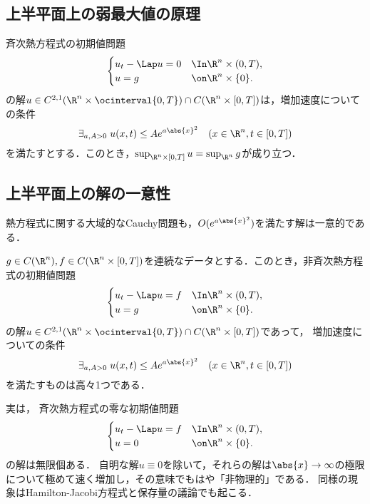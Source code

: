 \documentclass[uplatex,dvipdfmx]{jsreport}
\begin{document}
\subsection{上半平面上の弱最大値の原理}

\begin{theorem}[非有界領域上の最大値の原理]
    斉次熱方程式の初期値問題
    \[\begin{cases}
        u_t-\Lap u=0&\In\R^n\times(0,T),\\
        u=g&\on\R^n\times\{0\}.
    \end{cases}\]
    の解$u\in C^{2,1}(\R^n\times\ocinterval{0,T})\cap C(\R^n\times[0,T])$は，増加速度についての条件
    \[\exists_{a,A>0}\;u(x,t)\le Ae^{a\abs{x}^2}\quad(x\in\R^n,t\in[0,T])\]
    を満たすとする．このとき，$\sup_{\R^n\times[0,T]}u=\sup_{\R^n}g$が成り立つ．
\end{theorem}

\subsection{上半平面上の解の一意性}

\begin{tcolorbox}[colframe=ForestGreen, colback=ForestGreen!10!white,breakable,colbacktitle=ForestGreen!40!white,coltitle=black,fonttitle=\bfseries\sffamily,
title=]
    熱方程式に関する大域的なCauchy問題も，$O(e^{a\abs{x}^2})$を満たす解は一意的である．
\end{tcolorbox}

\begin{theorem}[Cauchy問題の一意性]\label{thm-uniqueness-of-upper-half-plane}
    $g\in C(\R^n),f\in C(\R^n\times[0,T])$を連続なデータとする．このとき，非斉次熱方程式の初期値問題
    \[\begin{cases}
        u_t-\Lap u=f&\In\R^n\times(0,T),\\
        u=g&\on\R^n\times\{0\}.
    \end{cases}\]
    の解$u\in C^{2,1}(\R^n\times\ocinterval{0,T})\cap C(\R^n\times[0,T])$であって，
    増加速度についての条件
    \[\exists_{a,A>0}\;u(x,t)\le Ae^{a\abs{x}^2}\quad(x\in\R^n,t\in[0,T])\]
    を満たすものは高々1つである．
\end{theorem}

\begin{remarks}
    実は，
    斉次熱方程式の零な初期値問題
    \[\begin{cases}
        u_t-\Lap u=f&\In\R^n\times(0,T),\\
        u=0&\on\R^n\times\{0\}.
    \end{cases}\]
    の解は無限個ある．
    自明な解$u\equiv0$を除いて，それらの解は$\abs{x}\to\infty$の極限について極めて速く増加し，その意味でもはや「非物理的」である．
    同様の現象はHamilton-Jacobi方程式と保存量の議論でも起こる．
\end{remarks}
\end{document}
